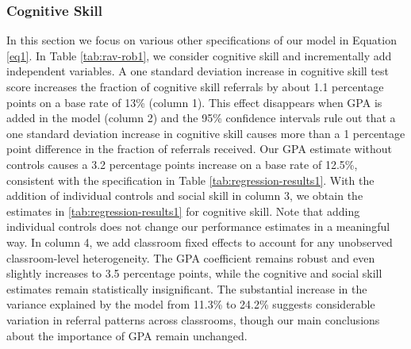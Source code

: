 \documentclass[11pt,a4paper,oneside]{article}
\begin{document}
\subsubsection*{Cognitive Skill}
In this section we focus on various other specifications of our model in Equation \ref{eq1}. In Table \ref{tab:rav-rob1}, we consider cognitive skill and incrementally add independent variables. A one standard deviation increase in cognitive skill test score increases the fraction of cognitive skill referrals by about 1.1 percentage points on a base rate of 13\% (column 1). This effect disappears when GPA is added in the model (column 2) and the 95\% confidence intervals rule out that a one standard deviation increase in cognitive skill causes more than a 1 percentage point difference in the fraction of referrals received. Our GPA estimate without controls causes a 3.2 percentage points increase on a base rate of 12.5\%, consistent with the specification in Table \ref{tab:regression-results1}. With the addition of individual controls and social skill in column 3, we obtain the estimates in \ref{tab:regression-results1} for cognitive skill. Note that adding individual controls does not change our performance estimates in a meaningful way. In column 4, we add classroom fixed effects to account for any unobserved classroom-level heterogeneity. The GPA coefficient remains robust and even slightly increases to 3.5 percentage points, while the cognitive and social skill estimates remain statistically insignificant. The substantial increase in the variance explained by the model from 11.3\% to 24.2\% suggests considerable variation in referral patterns across classrooms, though our main conclusions about the importance of GPA remain unchanged.
\end{document}
